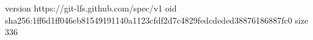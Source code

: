 version https://git-lfs.github.com/spec/v1
oid sha256:1ff6d1ff046eb81549191140a1123cfdf2d7c4829fedcdeded38876186887fc0
size 336
